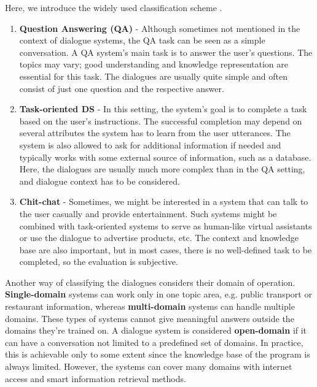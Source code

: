 Here, we introduce the widely used classification scheme \cite{jurafsky2000speech}.
\begin{enumerate}
    \item \textbf{Question Answering (QA)} - Although sometimes not mentioned in the context of dialogue systems, the QA task can be seen as a simple conversation. A QA system's main task is to answer the user's questions.
    The topics may vary; good understanding and knowledge representation are essential for this task.
    The dialogues are usually quite simple and often consist of just one question and the respective answer.
    \item \textbf{Task-oriented DS} - In this setting, the system's goal is to complete a task based on the user's instructions.
    The successful completion may depend on several attributes the system has to learn from the user utterances.
    The system is also allowed to ask for additional information if needed and typically works with some external source of information, such as a database.
    Here, the dialogues are usually much more complex than in the QA setting, and dialogue context has to be considered.
    \item \textbf{Chit-chat} - Sometimes, we might be interested in a system that can talk to the user casually and provide entertainment.
    Such systems might be combined with task-oriented systems to serve as human-like virtual assistants or use the dialogue to advertise products, etc.
    The context and knowledge base are also important, but in most cases, there is no well-defined task to be completed, so the evaluation is subjective.
\end{enumerate}

Another way of classifying the dialogues considers their domain of operation.
\textbf{Single-domain} systems can work only in one topic area, e.g. public transport or restaurant information, whereas \textbf{multi-domain} systems can handle multiple domains.
These types of systems cannot give meaningful answers outside the domains they're trained on.
A dialogue system is considered \textbf{open-domain} if it can have a conversation not limited to a predefined set of domains.
In practice, this is achievable only to some extent since the knowledge base of the program is always limited.
However, the systems can cover many domains with internet access and smart information retrieval methods.


